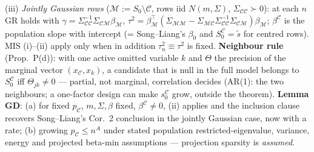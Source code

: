 \begin{theorem}[MIS]
(iii) \emph{Jointly Gaussian rows} ($\mathcal M:=S_0\setminus\mathcal C$, rows iid $N(m,\Sigma)$, $\Sigma_{\mathcal C\mathcal C}\succ0$): at each $n$ GR holds with $\gamma=\Sigma_{\mathcal C\mathcal C}^{-1}\Sigma_{\mathcal C\mathcal M}\beta_{\mathcal M}$, $\tau^2=\beta_{\mathcal M}^\top(\Sigma_{\mathcal M\mathcal M}-\Sigma_{\mathcal M\mathcal C}\Sigma_{\mathcal C\mathcal C}^{-1}\Sigma_{\mathcal C\mathcal M})\beta_{\mathcal M}$; $\beta^{\mathcal C}$ is the population slope with intercept (= Song--Liang's $\beta_0$ and $S_0^{\mathcal C}=\tilde{s}$ for centred rows). MIS (i)--(ii) apply only when in addition $\tau_n^2\equiv\tau^2$ is fixed. \textbf{Neighbour rule} (Prop.~P(d)): with one active omitted variable $k$ and $\Theta$ the precision of the marginal vector $(x_{\mathcal C},x_k)$, a candidate that is null in the full model belongs to $S_0^{\mathcal C}$ iff $\Theta_{jk}\ne0$ — partial, not marginal, correlation decides (AR(1): the two neighbours; a one-factor design can make $s_0^{\mathcal C}$ grow, outside the theorem). \textbf{Lemma GD}: (a) for fixed $p_{\mathcal C}$, $m,\Sigma,\beta$ fixed, $\beta^{\mathcal C}\ne0$, (ii) applies and the inclusion clause recovers Song--Liang's Cor.~2 conclusion in the jointly Gaussian case, now with a rate; (b) growing $p_{\mathcal C}\le n^A$ under stated population restricted-eigenvalue, variance, energy and projected beta-min assumptions — projection sparsity is \emph{assumed}.
\end{theorem}
